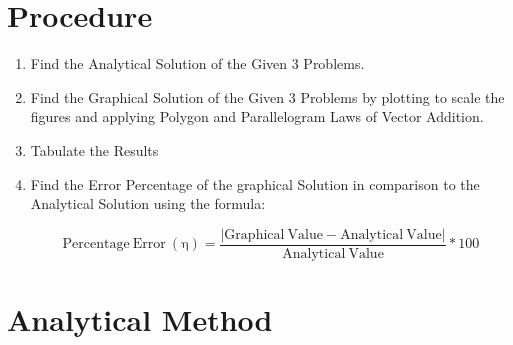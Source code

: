 \documentclass[11pt]{article}
\begin{document}
\section{Procedure}
	\begin{enumerate}
		\item Find the Analytical Solution of the Given 3 Problems.
		\item Find the Graphical Solution of the Given 3 Problems by plotting to scale the figures and applying Polygon and Parallelogram Laws of Vector Addition. 
		\item Tabulate the Results
		\item Find the Error Percentage of the graphical Solution in comparison to the Analytical Solution using the formula:
		
		$$\mathrm{Percentage\ Error\ (\eta)} = \dfrac{|\mathrm{Graphical\ Value} - \mathrm{Analytical\ Value}|}{\mathrm{Analytical\ Value}} * 100$$
	\end{enumerate}
\pagebreak
\section{Analytical Method}
\end{document}
